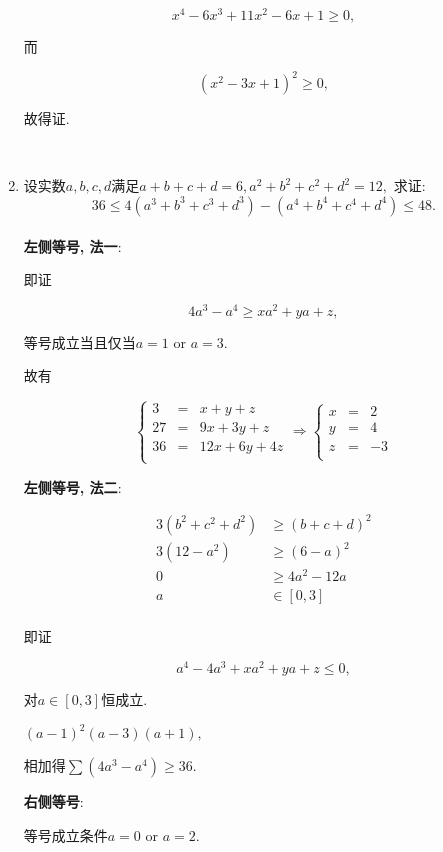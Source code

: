 \documentclass[8pt]{article}
\begin{document}
\begin{enumerate}
			$$x^4 - 6x^3 + 11x^2 - 6x + 1 \geq 0,$$

			而

			$$(x^2-3x+1)^2 \geq 0,$$

			故得证.

		~\\

		\item 设实数$a, b, c, d$满足$a+b+c+d=6, a^2 + b^2 + c^2 + d^2 = 12,$ 求证: $$36 \leq 4 (a^3 + b^3 + c^3 + d^3) - (a^4 + b^4 + c^4 + d^4) \leq 48.$$
			~\\

			\textbf{左侧等号, 法一}:

			即证

			$$4a^3-a^4 \geq xa^2 + ya + z,$$

			等号成立当且仅当$a = 1$ or $a = 3$.

			故有

			$$
			\left\{
			\begin{array}{rcl}
				3 &=& x+y+z\\
				27 &=& 9x+3y+z\\
				36 &=& 12x+6y+4z\\
			\end{array}
			\right.
			\Rightarrow
			\left\{
			\begin{array}{rcl}
				x &=& 2\\
				y &=& 4\\
				z &=& -3\\
			\end{array}
			\right.
			$$

			\textbf{左侧等号, 法二}:

			\begin{align*}
				3(b^2+c^2+d^2) &\geq (b+c+d)^2\\
				3(12-a^2) &\geq (6-a)^2\\
				0 &\geq 4a^2 - 12a\\
				a &\in [0, 3]\\
			\end{align*}

			即证

			$$a^4 - 4a^3 + xa^2 + ya + z \leq 0,$$

			对$a \in [0, 3]$恒成立.

			$(a-1)^2 (a-3) (a+1),$

			相加得$\sum (4a^3 - a^4) \geq 36.$

			\textbf{右侧等号}:

			等号成立条件$a=0$ or $a=2$.


\end{enumerate}
\end{document}
